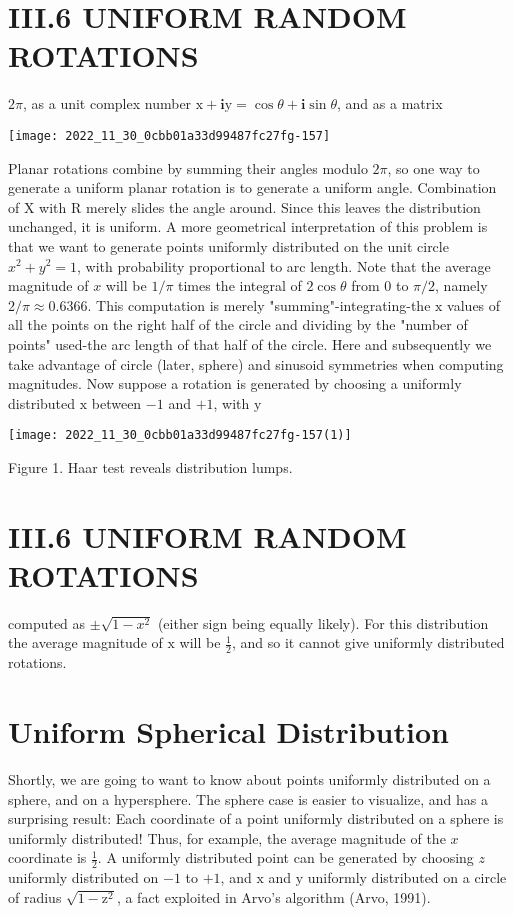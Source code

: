 \section{III.6 UNIFORM RANDOM ROTATIONS}
$2 \pi$, as a unit complex number $\mathrm{x}+\mathbf{i} \mathrm{y}=\cos \theta+\mathbf{i} \sin \theta$, and as a matrix

\begin{center}
\texttt{[image: 2022\_11\_30\_0cbb01a33d99487fc27fg-157]}
\end{center}

Planar rotations combine by summing their angles modulo $2 \pi$, so one way to generate a uniform planar rotation is to generate a uniform angle. Combination of $\mathrm{X}$ with $\mathrm{R}$ merely slides the angle around. Since this leaves the distribution unchanged, it is uniform. A more geometrical interpretation of this problem is that we want to generate points uniformly distributed on the unit circle $x^{2}+y^{2}=1$, with probability proportional to arc length. Note that the average magnitude of $x$ will be $1 / \pi$ times the integral of $2 \cos \theta$ from 0 to $\pi / 2$, namely $2 / \pi \approx 0.6366$. This computation is merely "summing"-integrating-the $\mathrm{x}$ values of all the points on the right half of the circle and dividing by the "number of points" used-the arc length of that half of the circle. Here and subsequently we take advantage of circle (later, sphere) and sinusoid symmetries when computing magnitudes. Now suppose a rotation is generated by choosing a uniformly distributed $\mathrm{x}$ between $-1$ and $+1$, with $\mathrm{y}$

\begin{center}
\texttt{[image: 2022\_11\_30\_0cbb01a33d99487fc27fg-157(1)]}
\end{center}

Figure 1. Haar test reveals distribution lumps.

\section{III.6 UNIFORM RANDOM ROTATIONS}
computed as $\pm \sqrt{1-x^{2}}$ (either sign being equally likely). For this distribution the average magnitude of $\mathrm{x}$ will be $\frac{1}{2}$, and so it cannot give uniformly distributed rotations.

\section{Uniform Spherical Distribution}
Shortly, we are going to want to know about points uniformly distributed on a sphere, and on a hypersphere. The sphere case is easier to visualize, and has a surprising result: Each coordinate of a point uniformly distributed on a sphere is uniformly distributed! Thus, for example, the average magnitude of the $x$ coordinate is $\frac{1}{2}$. A uniformly distributed point can be generated by choosing $z$ uniformly distributed on $-1$ to $+1$, and $\mathrm{x}$ and $\mathrm{y}$ uniformly distributed on a circle of radius $\sqrt{1-\mathrm{z}^{2}}$, a fact exploited in Arvo's algorithm (Arvo, 1991).

